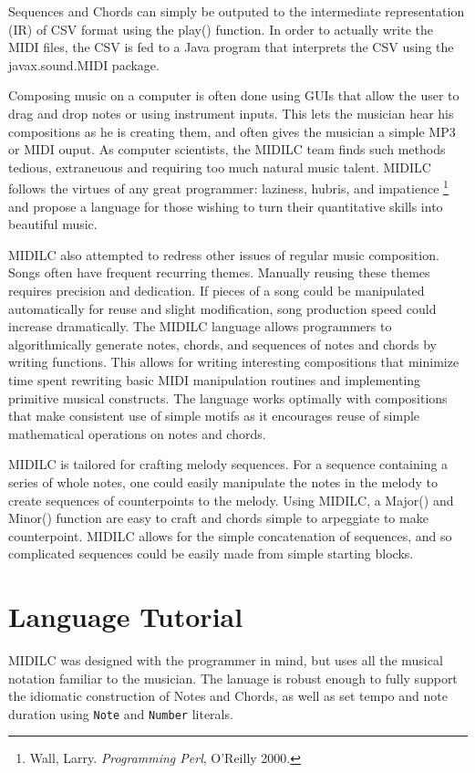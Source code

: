\documentclass[12pt,A4]{book}
\begin{document}
Sequences and Chords can simply be outputed to the intermediate representation (IR) of CSV format using the play() function. In order to actually write the MIDI files, the CSV is fed to a Java program that interprets the CSV using the javax.sound.MIDI package.

Composing music on a computer is often done using GUIs that allow the user to drag and drop notes or using instrument inputs. This lets the musician hear his compositions as he is creating them, and often gives the musician a simple MP3 or MIDI ouput. As computer scientists, the MIDILC team finds such methods tedious, extraneuous and requiring too much natural music talent. MIDILC follows the virtues of any great programmer: laziness, hubris, and impatience \footnote{Wall, Larry. \textit{Programming Perl}, O'Reilly 2000.} and propose a language for those wishing to turn their quantitative skills into beautiful music.

MIDILC also attempted to redress other issues of regular music composition. Songs often have frequent recurring themes. Manually reusing these themes requires precision and dedication. If pieces of a song could be manipulated automatically for reuse and slight modification, song production speed could increase dramatically. The MIDILC language allows programmers to algorithmically generate notes, chords, and sequences of notes and chords by writing functions. This allows for writing interesting compositions that minimize time spent rewriting basic MIDI manipulation routines and implementing primitive musical constructs. The language works optimally with compositions that make consistent use of simple motifs as it encourages reuse of simple mathematical operations on notes and chords. 

MIDILC is tailored for crafting melody sequences. For a sequence containing a series of whole notes, one could easily manipulate the notes in the melody to create sequences of counterpoints to the melody. Using MIDILC, a Major() and Minor() function are easy to craft and chords simple to arpeggiate to make counterpoint. MIDILC allows for the simple concatenation of sequences, and so complicated sequences could be easily made from simple starting blocks.

\chapter{Language Tutorial}
MIDILC was designed with the programmer in mind, but uses all the musical notation familiar to the musician. The lanuage is robust enough to fully support the idiomatic construction of Notes and Chords, as well as set tempo and note duration using \verb|Note| and \verb|Number| literals.
\end{document}

